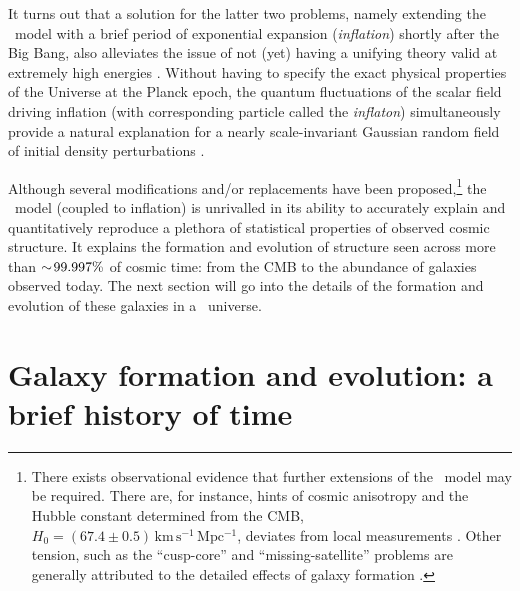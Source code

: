 It turns out that a solution for the latter two problems, namely extending the \LCDM\ model with a brief period of exponential expansion (\textit{inflation}) shortly after the Big Bang, also alleviates the issue of not (yet) having a unifying theory valid at extremely high energies \citep{1980PhLB...91...99S, 1980ApJ...241L..59K, 1981PhRvD..23..347G, 1982PhLB..108..389L, 1982PhRvL..48.1220A}. Without having to specify the exact physical properties of the Universe at the Planck epoch, the quantum fluctuations of the scalar field driving inflation (with corresponding particle called the \textit{inflaton}) simultaneously provide a natural explanation for a nearly scale-invariant Gaussian random field of initial density perturbations \citep{1982PhLB..115..295H, 1982PhRvL..49.1110G, 1983PhRvD..28..679B}.

Although several modifications and/or replacements have been proposed,\footnote{There exists observational evidence that further extensions of the \LCDM\ model may be required. There are, for instance, hints of cosmic anisotropy \citep[e.g.][]{2022arXiv220805018P} and the Hubble constant determined from the CMB, $H_0 = (67.4 \pm 0.5) \, \mathrm{km \, s^{-1}  \, Mpc^{-1}}$, deviates from local measurements \citep{2020A&A...641A...6P}. Other tension, such as the ``cusp-core'' and ``missing-satellite'' problems are generally attributed to the detailed effects of galaxy formation \citep[``baryonic physics''; e.g.][]{2012MNRAS.421.3464P, 2016ApJ...827L..23W}.} the \LCDM\ model (coupled to inflation) is unrivalled in its ability to accurately explain and quantitatively reproduce a plethora of statistical properties of observed cosmic structure. It explains the formation and evolution of structure seen across more than $\sim \! 99.997\%$ of cosmic time: from the CMB to the abundance of galaxies observed today. The next section will go into the details of the formation and evolution of these galaxies in a \LCDM\ universe.

\section{Galaxy formation and evolution: a brief history of time}

